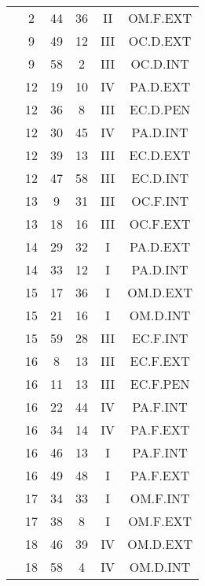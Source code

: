 \documentclass[12pt, a4paper]{article}
\begin{document}
\begin{multicols}{3}
{\begin{tabular}{c c c c c c}
	 	 	 	 & 2 & 44 & 36 & II & OM.F.EXT\\%
	 	 	 	 & 9 & 49 & 12 & III & OC.D.EXT\\%
	 	 	 	 & 9 & 58 & 2 & III & OC.D.INT\\%
	 	 	 	 & 12 & 19 & 10 & IV & PA.D.EXT\\%
	 	 	 	 & 12 & 36 & 8 & III & EC.D.PEN\\%
	 	 	 	 & 12 & 30 & 45 & IV & PA.D.INT\\%
	 	 	 	 & 12 & 39 & 13 & III & EC.D.EXT\\%
	 	 	 	 & 12 & 47 & 58 & III & EC.D.INT\\%
	 	 	 	 & 13 & 9 & 31 & III & OC.F.INT\\%
	 	 	 	 & 13 & 18 & 16 & III & OC.F.EXT\\%
	 	 	 	 & 14 & 29 & 32 & I & PA.D.EXT\\%
	 	 	 	 & 14 & 33 & 12 & I & PA.D.INT\\%
	 	 	 	 & 15 & 17 & 36 & I & OM.D.EXT\\%
	 	 	 	 & 15 & 21 & 16 & I & OM.D.INT\\%
	 	 	 	 & 15 & 59 & 28 & III & EC.F.INT\\%
	 	 	 	 & 16 & 8 & 13 & III & EC.F.EXT\\%
	 	 	 	 & 16 & 11 & 13 & III & EC.F.PEN\\%
	 	 	 	 & 16 & 22 & 44 & IV & PA.F.INT\\%
	 	 	 	 & 16 & 34 & 14 & IV & PA.F.EXT\\%
	 	 	 	 & 16 & 46 & 13 & I & PA.F.INT\\%
	 	 	 	 & 16 & 49 & 48 & I & PA.F.EXT\\%
	 	 	 	 & 17 & 34 & 33 & I & OM.F.INT\\%
	 	 	 	 & 17 & 38 & 8 & I & OM.F.EXT\\%
	 	 	 	 & 18 & 46 & 39 & IV & OM.D.EXT\\%
	 	 	 	 & 18 & 58 & 4 & IV & OM.D.INT\\%
	 	 \end{tabular}
 	}
\end{multicols}
\end{document}

